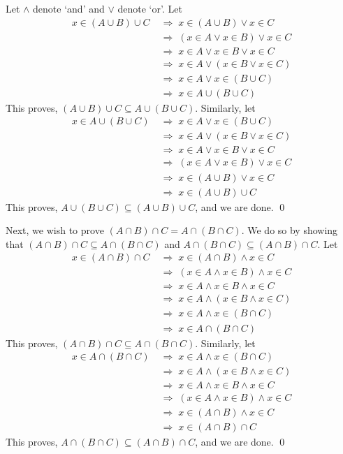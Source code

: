 \documentclass[10pt]{article}
\begin{document}
\begin{enumerate}
		Let $\land$ denote `and' and $\lor$ denote `or'. Let
		\begin{align*}
			x \in (A \cup B) \cup C
			\;&\Rightarrow\; x \in (A \cup B) \lor x \in C\\
			\;&\Rightarrow\; (x \in A \lor x \in B) \lor x \in C\\
			\;&\Rightarrow\; x \in A \lor x \in B \lor x \in C\\
			\;&\Rightarrow\; x \in A \lor (x \in B \lor x \in C)\\
			\;&\Rightarrow\; x \in A \lor x \in (B \cup C)\\
			\;&\Rightarrow\; x \in A \cup (B \cup C)
		\end{align*}
		This proves, $(A \cup B) \cup C \subseteq A \cup (B \cup C)$. Similarly, let
		\begin{align*}
			x \in A \cup (B \cup C)
			\;&\Rightarrow\; x \in A \lor x \in (B \cup C)\\
			\;&\Rightarrow\; x \in A \lor (x \in B \lor x \in C)\\
			\;&\Rightarrow\; x \in A \lor x \in B \lor x \in C\\
			\;&\Rightarrow\; (x \in A \lor x \in B) \lor x \in C\\
			\;&\Rightarrow\; x \in (A \cup B) \lor x \in C\\
			\;&\Rightarrow\; x \in (A \cup B) \cup C
		\end{align*}
		This proves, $A \cup (B \cup C) \subseteq (A \cup B) \cup C$, and we are done. \qed
		
		Next, we wish to prove $(A \cap B) \cap C = A \cap (B \cap C)$. We do so by showing that $(A \cap B) \cap C \subseteq A \cap (B \cap C)$
		and $A \cap (B \cap C) \subseteq (A \cap B) \cap C$. Let
		\begin{align*}
			x \in (A \cap B) \cap C
			\;&\Rightarrow\; x \in (A \cap B) \land x \in C\\
			\;&\Rightarrow\; (x \in A \land x \in B) \land x \in C\\
			\;&\Rightarrow\; x \in A \land x \in B \land x \in C\\
			\;&\Rightarrow\; x \in A \land (x \in B \land x \in C)\\
			\;&\Rightarrow\; x \in A \land x \in (B \cap C)\\
			\;&\Rightarrow\; x \in A \cap (B \cap C)
		\end{align*}
		This proves, $(A \cap B) \cap C \subseteq A \cap (B \cap C)$. Similarly, let
		\begin{align*}
			x \in A \cap (B \cap C)
			\;&\Rightarrow\; x \in A \land x \in (B \cap C)\\
			\;&\Rightarrow\; x \in A \land (x \in B \land x \in C)\\
			\;&\Rightarrow\; x \in A \land x \in B \land x \in C\\
			\;&\Rightarrow\; (x \in A \land x \in B) \land x \in C\\
			\;&\Rightarrow\; x \in (A \cap B) \land x \in C\\
			\;&\Rightarrow\; x \in (A \cap B) \cap C
		\end{align*}
		This proves, $A \cap (B \cap C) \subseteq (A \cap B) \cap C$, and we are done. \qed
		

\end{enumerate}
\end{document}
